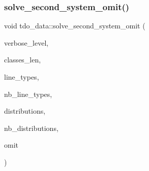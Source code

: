 \subsubsection{\texorpdfstring{solve\+\_\+second\+\_\+system\+\_\+omit()}{solve\_second\_system\_omit()}}
{\footnotesize\ttfamily void tdo\+\_\+data\+::solve\+\_\+second\+\_\+system\+\_\+omit (\begin{DoxyParamCaption}\item[{\mbox{\hyperlink{galois_8h_a09fddde158a3a20bd2dcadb609de11dc}{I\+NT}}}]{verbose\+\_\+level,  }\item[{\mbox{\hyperlink{galois_8h_a09fddde158a3a20bd2dcadb609de11dc}{I\+NT}} $\ast$}]{classes\+\_\+len,  }\item[{\mbox{\hyperlink{galois_8h_a09fddde158a3a20bd2dcadb609de11dc}{I\+NT}} $\ast$\&}]{line\+\_\+types,  }\item[{\mbox{\hyperlink{galois_8h_a09fddde158a3a20bd2dcadb609de11dc}{I\+NT}} \&}]{nb\+\_\+line\+\_\+types,  }\item[{\mbox{\hyperlink{galois_8h_a09fddde158a3a20bd2dcadb609de11dc}{I\+NT}} $\ast$\&}]{distributions,  }\item[{\mbox{\hyperlink{galois_8h_a09fddde158a3a20bd2dcadb609de11dc}{I\+NT}} \&}]{nb\+\_\+distributions,  }\item[{\mbox{\hyperlink{galois_8h_a09fddde158a3a20bd2dcadb609de11dc}{I\+NT}}}]{omit }\end{DoxyParamCaption})}

\mbox{\label{classtdo__data_a3586a50dcb7a01843a2aa3a4f5a8c35d}} 

